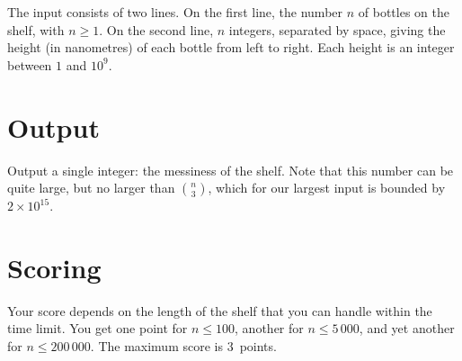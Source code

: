 The input consists of two lines.
On the first line, the number $n$ of bottles on the shelf, with $n\geq 1$.
On the second line, $n$ integers, separated by space, giving the height (in nanometres) of each bottle from left to right.
Each height is an integer between $1$ and $10^9$.

\section*{Output}

Output a single integer: the messiness of the shelf.
Note that this number can be quite large, but no larger than $\binom{n}{3}$, which for our largest input is bounded by $2 \times 10^{15}$.

\section*{Scoring}

Your score depends on the length of the shelf that you can handle within the time limit.
You get one point for $n\leq 100$, another for $n\leq 5\,000$, and yet another for $n\leq 200\,000$. 
The maximum score is $3$~points.

